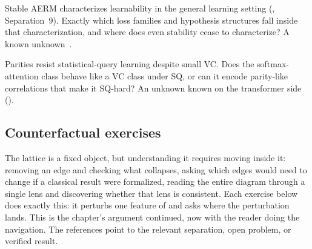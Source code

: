\begin{openprob}
\label{op:stability-scope}
Stable AERM characterizes learnability in the general learning setting
(, Separation~9).  Exactly which loss families and
hypothesis structures fall inside that characterization, and where does
even stability cease to characterize?  A known
unknown~\cite{ShalevShwartzShamir2010}.
\end{openprob}

\begin{openprob}
\label{op:attention-sq}
Parities resist statistical-query learning despite small VC.  Does the
softmax-attention class behave like a VC class under SQ, or can it encode
parity-like correlations that make it SQ-hard?  An unknown known on the
transformer side ().
\end{openprob}


\subsection*{Counterfactual exercises}

The lattice is a fixed object, but understanding it requires moving inside
it: removing an edge and checking what collapses, asking which edges would
need to change if a classical result were formalized, reading the entire
diagram through a single lens and discovering whether that lens is
consistent. Each exercise below does exactly this: it perturbs one feature
of  and asks where the perturbation lands.
This is the chapter's argument continued, now with the reader doing the
navigation. The references point to the relevant separation, open problem,
or verified result.

